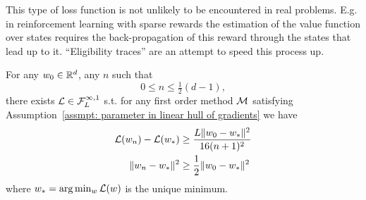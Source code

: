 \begin{remark}
	This type of loss function is not unlikely to be encountered in real
	problems. E.g. in reinforcement learning with sparse rewards the estimation
	of the value function over states requires the back-propagation of this
	reward through the states that lead up to it. ``Eligibility traces''
	\parencite[Chapter 12]{suttonReinforcementLearningIntroduction2018}
	are an attempt to speed this process up.
\end{remark}
\begin{theorem}
	\label{thm: convex function complexity bound}
	For any \(\weights_0\in\reals^d\), any \(n\) such that 
	\[0\le n\le \tfrac12 (d-1),\]
	there exists \(\Loss\in\lipGradientSet[\infty,1]{\ubound}\)
	s.t. for any first order method \(\firstOrderMethod\)
	satisfying Assumption~\ref{assmpt: parameter in linear hull of gradients}
	we have
	\begin{subequations}
	\begin{align}
		\Loss(\weights_n) - \Loss(\minimum)
		&\ge \frac{\ubound \|\weights_0 - \minimum\|^2}{16(n+1)^2} \\
		\|\weights_n -\minimum\|^2 
		&\ge \frac12 \|\weights_0 - \minimum\|^2
	\end{align}
	\end{subequations}
	where \(\minimum = \arg\min_\weights \Loss(\weights)\) is the unique minimum.
\end{theorem}
